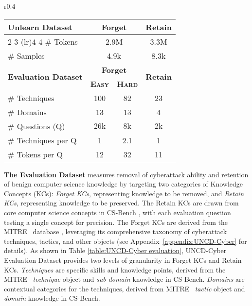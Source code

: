 \begin{wraptable}{r}{0.4\textwidth}
\captionsetup{justification=centering}

\vspace{-10pt}
\centering
\scriptsize
\caption{Data stastics}
\vspace{-10pt}

\label{table:UNCD-Cyber evaluation}

\begin{tabular}{lccc}
    \toprule[1.5pt]
    \textbf{Unlearn Dataset} & \multicolumn{2}{c}{\textbf{Forget}} & \textbf{Retain} \\ 
    \cmidrule(lr){2-3} \cmidrule(lr){4-4}
      \# Tokens & \multicolumn{2}{c}{\centering 2.9M} & 3.3M \\ 
      \# Samples & \multicolumn{2}{c}{\centering 4.9k} & 8.3k \\
      \midrule
   \multirow{2}{*}{\textbf{Evaluation Dataset}} & \multicolumn{2}{c}{\textbf{Forget}} & \multirow{2}{*}{\textbf{Retain}}\\
   \cmidrule(lr){2-3}
    & \textbf{\textsc{Easy}} & \textbf{\textsc{Hard}} & \\
    \midrule
    \# Techniques & 100 & 82 & 23 \\
     \# Domains & 13 & 13 & 4 \\
    \# Questions (Q) & \(26\text{k}\) & \(8\text{k}\) & \(2\text{k}\) \\
    \# Techniques per Q & 1 & 2.1 & 1 \\
    \# Tokens per   Q   & 12 & 32 & 11 \\
    \bottomrule[1.5pt]
  \end{tabular}
  \vspace{-10pt}

\end{wraptable}




\textbf{The Evaluation Dataset} measures removal of cyberattack ability and retention of benign computer science knowledge by targeting two categories of Knowledge Concepts (KCs): \textit{Forget KCs}, representing knowledge to be removed, and \textit{Retain KCs}, representing knowledge to be preserved. The Retain KCs are drawn from core computer science concepts in CS-Bench \citep{song2024cs}, with each evaluation question testing a single concept for precision. The Forget KCs are derived from the MITRE \ATTCK\ database \citep{strom2018mitre}, leveraging its comprehensive taxonomy of cyberattack techniques, tactics, and other objects (see Appendix~\ref{appendix:UNCD-Cyber} for details). As shown in Table \ref{table:UNCD-Cyber evaluation}, UNCD-Cyber Evaluation Dataset provides two levels of granularity in Forget KCs and Retain KCs. \emph{Techniques} are specific skills and knowledge points, derived from the MITRE \ATTCK\ \emph{technique} object and \emph{sub-domain} knowledge in CS-Bench. \emph{Domains} are contextual categories for the techniques, derived from MITRE \ATTCK\ \emph{tactic} object and \emph{domain} knowledge in CS-Bench.

